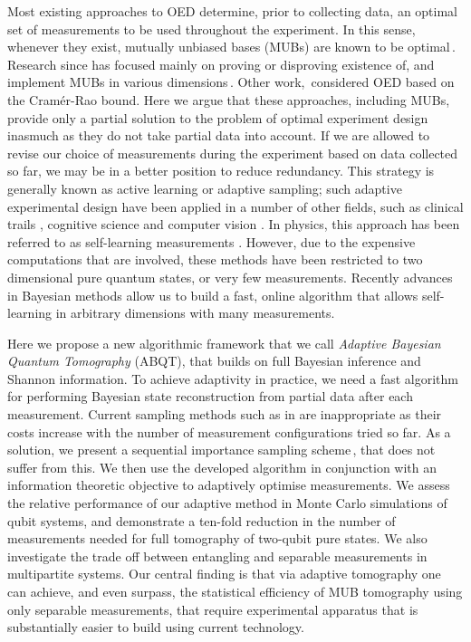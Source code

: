 Most existing approaches to OED determine, prior to collecting data, an optimal set of measurements to be used throughout the experiment. In this sense, whenever they exist, mutually unbiased bases (MUBs) are known to be optimal\,\cite{MUBFirst,MUBExperiment}. Research since has focused mainly on proving or disproving existence of, and implement MUBs in various dimensions\,\cite{DimensionSix,MUBQutrit,MUBExperiment}. Other work,\,\cite{OEDFirst,OEDAverage} considered OED based on the Cram\'{e}r-Rao bound. Here we argue that these approaches, including MUBs, provide only a partial solution to the problem of optimal experiment design inasmuch as they do not take partial data into account. If we are allowed to revise our choice of measurements during the experiment based on data collected so far, we may be in a better position to reduce redundancy. This strategy is generally known as active learning or adaptive sampling; such adaptive experimental design have been applied in a number of other fields, such as clinical trails \cite{Berry2006}, cognitive science \cite{Cavagnaro2010} and computer vision \cite{Vondrick2011}. In physics, this approach has been referred to as self-learning measurements \cite{SelfLearning, SelfLearningExperimental}. However, due to the expensive computations that are involved, these methods have been restricted to two dimensional pure quantum states, or very few measurements. Recently advances in Bayesian methods allow us to build a fast, online algorithm that allows self-learning in arbitrary dimensions with many measurements. 

Here we propose a new algorithmic framework that we call \emph{Adaptive Bayesian Quantum Tomography} (ABQT), that builds on full Bayesian inference and Shannon information. 
To achieve adaptivity in practice, we need a fast algorithm for performing Bayesian state reconstruction from partial data after each measurement. Current sampling methods such as in \cite{BayesianTomography} are inappropriate as their costs increase with the number of measurement configurations tried so far. As a solution, we present a sequential importance sampling scheme\,\cite{SMCBook}, that does not suffer from this. We then use the developed algorithm in conjunction with an information theoretic objective to adaptively optimise measurements. We assess the relative performance of our adaptive method in Monte Carlo simulations of qubit systems, and demonstrate a ten-fold reduction in the number of measurements needed for full tomography of two-qubit pure states. We also investigate the trade off between entangling and separable measurements in multipartite systems. Our central finding is that via adaptive tomography one can achieve, and even surpass, the statistical efficiency of MUB tomography using only separable measurements, that require experimental apparatus that is substantially easier to build using current technology.

